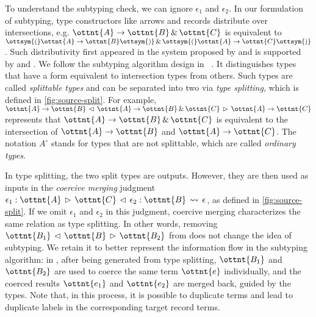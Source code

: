 To understand the subtyping check, we can ignore $\epsilon_{{\mathrm{1}}}$ and $\epsilon_{{\mathrm{2}}}$. In our
formulation of subtyping, type constructors like arrows and records distribute
over intersections, e.g. $\ottnt{A}  \rightarrow  \ottnt{B}  \, {\&} \,  \ottnt{C}$ is equivalent to $\ottsym{(}  \ottnt{A}  \rightarrow  \ottnt{B}  \ottsym{)}  \, {\&} \,  \ottsym{(}  \ottnt{A}  \rightarrow  \ottnt{C}  \ottsym{)}$. Such
distributivity first appeared in the system proposed by
\citet{barendregt1983filter} and is supported by \lambdaiplus and \fiplus. We
follow the subtyping algorithm design in \lambdaiplus~\citep{huang2021taming}.
It distinguishes types that have a form equivalent to intersection types from
others. Such types are called \emph{splittable types} and can be separated into
two via \emph{type splitting}, which is defined in \autoref{fig:source-split}.
For example, $ \ottnt{A}  \rightarrow  \ottnt{B} \,\lhd\, \ottnt{A}  \rightarrow  \ottnt{B}  \, {\&} \,  \ottnt{C} \,\rhd\, \ottnt{A}  \rightarrow  \ottnt{C} $ represents that $\ottnt{A}  \rightarrow  \ottnt{B}  \, {\&} \,  \ottnt{C}$ is
equivalent to the intersection of $\ottnt{A}  \rightarrow  \ottnt{B}$ and $\ottnt{A}  \rightarrow  \ottnt{C}$. The notation
$A^\circ$ stands for types that are not splittable, which are called
\emph{ordinary types}.

In type splitting, the two split types are outputs. However, they are then used
as inputs in the \emph{coercive merging} judgment $\epsilon_{{\mathrm{1}}}  :  \ottnt{A}  \,\rhd\,  \ottnt{C}  \,\lhd\,  \epsilon_{{\mathrm{2}}}  :  \ottnt{B}  \,\rightsquigarrow\,  \epsilon$,
as defined in \autoref{fig:source-split}. If we omit $\epsilon_{{\mathrm{1}}}$ and $\epsilon_{{\mathrm{2}}}$ in
this judgment, coercive merging characterizes the same relation as type
splitting. In other words, removing $ \ottnt{B_{{\mathrm{1}}}} \,\lhd\, \ottnt{B} \,\rhd\, \ottnt{B_{{\mathrm{2}}}} $ from  does
not change the idea of subtyping. We retain it to better represent the
information flow in the subtyping algorithm: in , after being
generated from type splitting, $\ottnt{B_{{\mathrm{1}}}}$ and $\ottnt{B_{{\mathrm{2}}}}$ are used to coerce the same
term $\ottnt{e}$ individually, and the coerced results $\ottnt{e_{{\mathrm{1}}}}$ and $\ottnt{e_{{\mathrm{2}}}}$ are
merged back, guided by the types. Note that, in this process, it is possible to
duplicate terms and lead to duplicate labels in the corresponding target record
terms.

